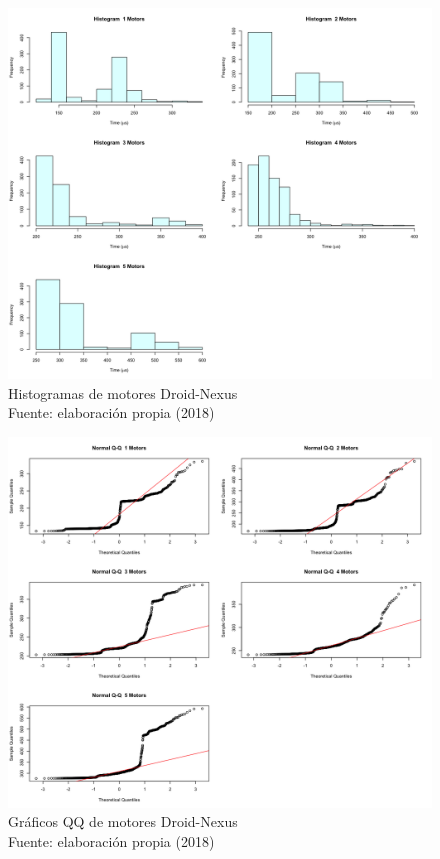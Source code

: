 \begin{figure}
 \begin{center} 
   	\includegraphics[width=1.0\textwidth]{evaluation/graphics/Droid/Nexus/HistMotorsDroidNexus.png} 
    \caption[Histogramas de motores Droid-Nexus]{Histogramas de motores  Droid-Nexus\\Fuente: elaboración propia (2018)} 
    \label{fig:droid-nexus-hist-motors}
  \end{center}
\end{figure}

\begin{figure}[H]
  \begin{center} 
   	\includegraphics[width=1.0\textwidth]{evaluation/graphics/Droid/Nexus/NormalQQMotorsDroidNexus.png} 
    \caption[Gráfico QQ de motores Droid-Nexus]{Gráficos QQ de motores Droid-Nexus\\Fuente: elaboración propia (2018)} 
    \label{fig:droid-nexus-QQ-motors}
  \end{center}
\end{figure}

